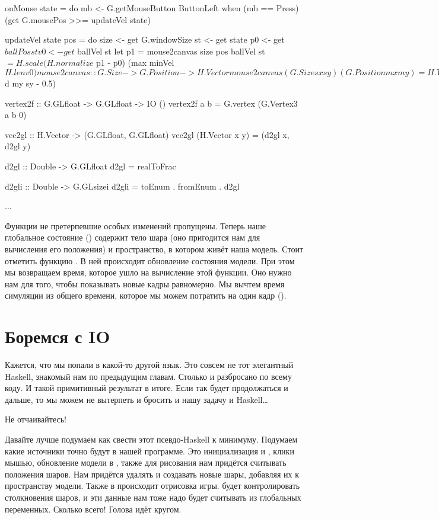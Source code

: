 \begin{code}
onMouse state = do    
    mb <- G.getMouseButton ButtonLeft
    when (mb == Press) (get G.mousePos >>= updateVel state)
   
updateVel state pos = do   
    size <- get G.windowSize
    st <- get state
    p0 <- get $ ballPos st
    v0 <- get $ ballVel st
    let p1 = mouse2canvas size pos
    ballVel st $= 
        H.scale (H.normalize $ p1 - p0) (max minVel $ H.len v0)

mouse2canvas :: G.Size -> G.Position -> H.Vector
mouse2canvas (G.Size sx sy) (G.Position mx my) = H.Vector x y
    where d a b  = fromIntegral a / fromIntegral b
          x  = width * (d mx sx - 0.5)
          y  = height * (negate $ d my sy - 0.5)


vertex2f :: G.GLfloat -> G.GLfloat -> IO ()
vertex2f a b = G.vertex (G.Vertex3 a b 0)

vec2gl :: H.Vector -> (G.GLfloat, G.GLfloat)
vec2gl (H.Vector x y) = (d2gl x, d2gl y)

d2gl :: Double -> G.GLfloat
d2gl = realToFrac

d2gli :: Double -> G.GLsizei
d2gli = toEnum . fromEnum . d2gl

...
\end{code}

Функции не претерпевшие особых изменений пропущены. Теперь наше
глобальное состояние () содержит тело шара (оно пригодится нам
для вычисления его положения) и пространство, в котором живёт наша
модель. Стоит отметить функцию . В ней происходит
обновление состояния модели. При этом мы возвращаем время, которое ушло
на вычисление этой функции. Оно нужно нам для того, чтобы показывать
новые кадры равномерно. Мы вычтем время симуляции из общего времени,
которое мы можем потратить на один кадр ().

\section{Боремся с IO}

Кажется, что мы попали в какой-то другой язык. Это совсем не тот
элегантный Haskell, знакомый нам по предыдущим главам. Столько  и
 разбросано по всему коду. И такой примитивный результат в итоге.
Если так будет продолжаться и дальше, то мы можем не вытерпеть и бросить
и нашу задачу и Haskell\ldots{}

Не отчаивайтесь!

Давайте лучше подумаем как свести этот псевдо-Haskell к минимуму.
Подумаем какие источники  точно будут в нашей программе. Это
инициализация  и , клики мышью, обновление модели в
, также для рисования нам придётся считывать положения
шаров. Нам придётся удалять и создавать новые шары, добавляя их к
пространству модели. Также в  происходит отрисовка игры.
 будет контролировать столкновения шаров, и эти данные нам
тоже надо будет считывать из глобальных переменных. Сколько всего!
Голова идёт кругом.

